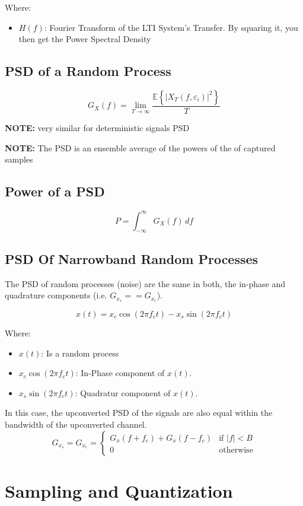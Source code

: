 \documentclass[10pt]{article}
\begin{document}
\noindent Where:
\begin{itemize}
    \item $H(f)$: Fourier Transform of the LTI System's Transfer. By squaring it, you then get the Power Spectral Density
\end{itemize}

\subsection{PSD of a Random Process}
\[
G_X(f) = \lim_{T \to \infty} \frac{\mathbb{E} \left\{ |X_T(f, \varepsilon_i)|^2 \right\}}{T}
\]

\noindent\textbf{NOTE:} very similar for deterministic signals PSD

\noindent\textbf{NOTE:} The PSD is an ensemble average of the powers of the of captured samples

\subsection{Power of a PSD}
\[
    P = \int_{-\infty}^{\infty} G_X(f) \, d\!f 
\]

\subsection{PSD Of Narrowband Random Processes}
The PSD of random processes (noise) are the same in both, the in-phase and quadrature components (i.e. $G_{x_s} == G_{x_c}$).

\[
    x(t) = x_c \cos(2\pi f_c t) - x_s \sin(2 \pi f_c t)
\]

\noindent Where:
\begin{itemize}
    \item $x(t)$: Is a random process
    \item $x_c\cos(2\pi f_c t)$: In-Phase component of $x(t)$.
    \item $x_s\sin(2\pi f_c t)$: Quadratur component of $x(t)$.
\end{itemize}

In this case, the upconverted PSD of the signals are also equal within the bandwidth of the upconverted channel.
\[
    G_{x_s} = G_{x_c} =
    \begin{cases}
      G_x(f + f_c) + G_x(f - f_c) & \text{if } |f| < B\\
      0 & \text{otherwise}
   \end{cases}
\]

\section{Sampling and Quantization}
\end{document}
